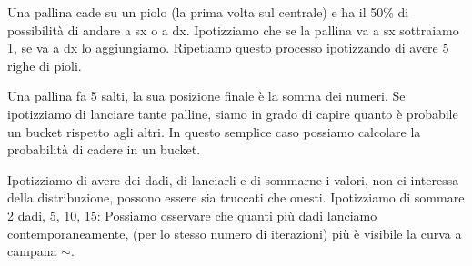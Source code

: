 Una pallina cade su un piolo (la prima volta sul centrale) e ha il 50\% di possibilità di andare a sx o a dx. Ipotizziamo che se la pallina va a sx sottraiamo 1, se va a dx lo aggiungiamo. Ripetiamo questo processo ipotizzando di avere 5 righe di pioli. 

Una pallina fa 5 salti, la sua posizione finale è la somma dei numeri. 
Se ipotizziamo di lanciare tante palline, siamo in grado di capire quanto è probabile un bucket rispetto agli altri. In questo semplice caso possiamo calcolare la probabilità di cadere in un bucket.

Ipotizziamo di avere dei dadi, di lanciarli e di sommarne i valori, non ci interessa della distribuzione, possono essere sia truccati che onesti. Ipotizziamo di sommare 2 dadi, 5, 10, 15:
Possiamo osservare che quanti più dadi lanciamo contemporaneamente, (per lo stesso numero di iterazioni) più è visibile la curva a campana $\sim$.

